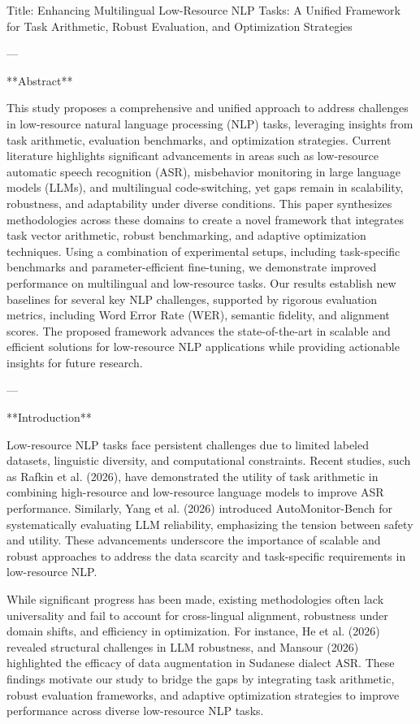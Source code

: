 Title: Enhancing Multilingual Low-Resource NLP Tasks: A Unified Framework for Task Arithmetic, Robust Evaluation, and Optimization Strategies

---

**Abstract**

This study proposes a comprehensive and unified approach to address challenges in low-resource natural language processing (NLP) tasks, leveraging insights from task arithmetic, evaluation benchmarks, and optimization strategies. Current literature highlights significant advancements in areas such as low-resource automatic speech recognition (ASR), misbehavior monitoring in large language models (LLMs), and multilingual code-switching, yet gaps remain in scalability, robustness, and adaptability under diverse conditions. This paper synthesizes methodologies across these domains to create a novel framework that integrates task vector arithmetic, robust benchmarking, and adaptive optimization techniques. Using a combination of experimental setups, including task-specific benchmarks and parameter-efficient fine-tuning, we demonstrate improved performance on multilingual and low-resource tasks. Our results establish new baselines for several key NLP challenges, supported by rigorous evaluation metrics, including Word Error Rate (WER), semantic fidelity, and alignment scores. The proposed framework advances the state-of-the-art in scalable and efficient solutions for low-resource NLP applications while providing actionable insights for future research.

---

**Introduction**

Low-resource NLP tasks face persistent challenges due to limited labeled datasets, linguistic diversity, and computational constraints. Recent studies, such as Rafkin et al. (2026), have demonstrated the utility of task arithmetic in combining high-resource and low-resource language models to improve ASR performance. Similarly, Yang et al. (2026) introduced AutoMonitor-Bench for systematically evaluating LLM reliability, emphasizing the tension between safety and utility. These advancements underscore the importance of scalable and robust approaches to address the data scarcity and task-specific requirements in low-resource NLP.

While significant progress has been made, existing methodologies often lack universality and fail to account for cross-lingual alignment, robustness under domain shifts, and efficiency in optimization. For instance, He et al. (2026) revealed structural challenges in LLM robustness, and Mansour (2026) highlighted the efficacy of data augmentation in Sudanese dialect ASR. These findings motivate our study to bridge the gaps by integrating task arithmetic, robust evaluation frameworks, and adaptive optimization strategies to improve performance across diverse low-resource NLP tasks.

